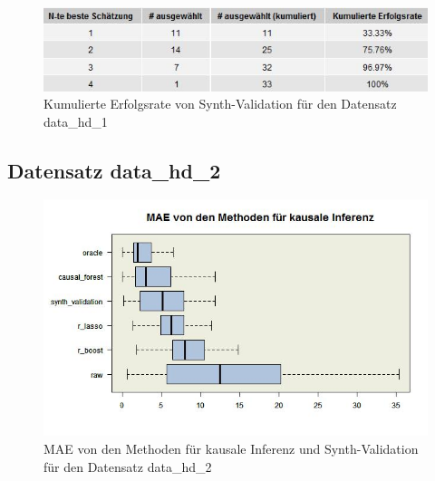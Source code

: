 \documentclass[12pt,a4paper,twoside]{scrartcl}
\numberwithin{equation}{section}
\newcounter{mypagecount}%
\newenvironment{interlude}{%
  \clearpage
  \setcounter{mypagecount}{\value{page}}%
  \thispagestyle{empty}%
  \pagestyle{empty}%
}{%
  \clearpage
  \setcounter{page}{\value{mypagecount}}%
}
\begin{document}
\begin{interlude}
\begin{appendices}
\begin{center}
\begin{figure}[H]
    \centering
    \includegraphics[height=0.2\textwidth, width=1\textwidth]{figures/plots/appendix/generatedDataHD1Grid.jpeg}
    \vspace{1mm}
    \caption[Kumulierte Erfolgsrate von Synth-Validation für den Datensatz data\_hd\_1]{Kumulierte Erfolgsrate von Synth-Validation für den Datensatz data\_hd\_1}
  \end{figure}
\end{center}

\subsection{Datensatz data\_hd\_2}

\begin{center}
\begin{figure}[H]
    \centering
    \includegraphics[height=0.5\textwidth, width=1\textwidth]{figures/plots/appendix/generatedDataHD2Boxplot.jpeg}
    \caption[MAE von den Methoden für kausale Inferenz und Synth-Validation für den Datensatz data\_hd\_2]{MAE von den Methoden für kausale Inferenz und Synth-Validation für den Datensatz data\_hd\_2}
  \end{figure}
\end{center}


\end{appendices}
\end{interlude}
\end{document}
